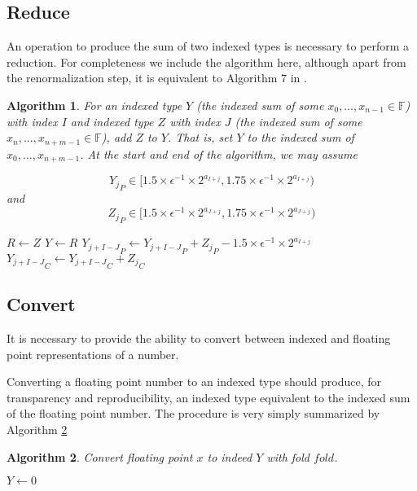 \documentclass[12pt]{article}
\providecommand{\F}{\ensuremath{\mathbb{F}}}
\theoremstyle{plain}
\newtheorem{alg}{Algorithm}[section]
\begin{document}
  \subsection{Reduce}
    An operation to produce the sum of two indexed types is necessary to perform a reduction. For completeness we include the algorithm here, although apart from the renormalization step, it is equivalent to Algorithm $7$ in \cite{repsum}.
    \begin{alg}
      For an indexed type $Y$ (the indexed sum of some $x_0, ..., x_{n - 1} \in \F$) with index $I$ and indexed type $Z$ with index $J$ (the indexed sum of some $x_n, ..., x_{n + m - 1} \in \F$), add $Z$ to $Y$. That is, set $Y$ to the indexed sum of $x_0, ..., x_{n + m - 1}$. At the start and end of the algorithm, we may assume

    \begin{equation*}
      {Y_j}_P \in [1.5 \times \epsilon^{-1}\times 2^{a_{I + j}}, 1.75 \times \epsilon^{-1}\times 2^{a_{I + j}})
    \end{equation*}
    and
    \begin{equation*}
      {Z_j}_P \in [1.5 \times \epsilon^{-1}\times 2^{a_{J + j}}, 1.75 \times \epsilon^{-1}\times 2^{a_{J + j}})
    \end{equation*}
      \begin{algorithmic}
            \State $R \gets Z$
            \State {}
            \State $Y \gets R$
          \EndIf
            \State ${Y_{j + I - J}}_P \gets {Y_{j + I - J}}_P + {Z_j}_P - 1.5 \times \epsilon^{-1} \times 2^{a_{I + j}}$
            \State ${Y_{j + I - J}}_C \gets {Y_{j + I - J}}_C + {Z_j}_C$
          \EndFor
          \State {}
        \EndFunction
      \end{algorithmic}
      \label{alg:reduce}
    \end{alg}

  \subsection{Convert}
    \label{sec:convert}
    It is necessary to provide the ability to convert between indexed and floating point representations of a number.

    Converting a floating point number to an indexed type should produce, for transparency and reproducibility, an indexed type equivalent to the indexed sum of the floating point number.
    The procedure is very simply summarized by Algorithm \ref{alg:conv2indexed}
    \begin{alg}
      Convert floating point $x$ to indeed $Y$ with fold $fold$.
      \begin{algorithmic}
          \State $Y \gets 0$
          \State {}
          \State {}
          \State {}
        \EndFunction
      \end{algorithmic}
      \label{alg:conv2indexed}
    \end{alg}
\end{document}
